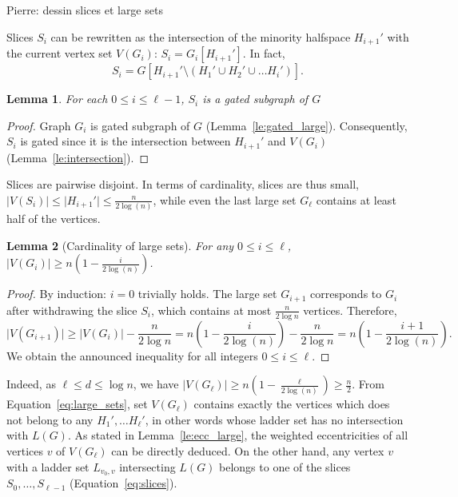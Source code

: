 \documentclass[11pt,letterpaper]{article}
\newtheorem{lemma}{Lemma}
\newcommand{\PB}[1]{{\color{orange} Pierre: #1}}
\begin{document}
\PB{dessin slices et large sets}

Slices $S_i$ can be rewritten as the intersection of the minority halfspace $H_{i+1}'$ with the current vertex set $V(G_i)$: $S_i = G_i[H_{i+1}']$. In fact,
\begin{equation}
S_i = G\left[H_{i+1}' \setminus \left(H_1'\cup H_2'\cup \ldots H_i'\right)\right].
\label{eq:slices}
\end{equation}

\begin{lemma}
For each $0\le i\le \ell-1$, $S_i$ is a gated subgraph of $G$
\label{le:gated_slices}
\end{lemma}
\begin{proof}
Graph $G_i$ is gated subgraph of $G$ (Lemma~\ref{le:gated_large}). Consequently, $S_i$ is gated since it is the intersection between $H_{i+1}'$ and $V(G_i)$ (Lemma~\ref{le:intersection}).
\end{proof}

Slices are pairwise disjoint. In terms of cardinality, slices are thus small, $\vert V(S_i) \vert \le \vert H_{i+1}' \vert \le \frac{n}{2\log(n)}$, while even the last large set $G_{\ell}$ contains at least half of the vertices.

\begin{lemma}[Cardinality of large sets]
For any $0\le i\le \ell$, $\vert V(G_i) \vert \ge n(1-\frac{i}{2\log(n)})$.
\label{le:card_slices}
\end{lemma}
\begin{proof}
By induction: $i=0$ trivially holds. The large set $G_{i+1}$ corresponds to $G_i$ after withdrawing the slice $S_i$, which contains at most $\frac{n}{2\log n}$ vertices. Therefore, $$\vert V(G_{i+1}) \vert \ge \vert V(G_i)\vert - \frac{n}{2\log n} = n\left(1-\frac{i}{2\log(n)}\right) - \frac{n}{2\log n} = n\left(1-\frac{i+1}{2\log(n)}\right).$$
We obtain the announced inequality for all integers $0\le i\le \ell$.
\end{proof}

Indeed, as $\ell \le d\le \log n$, we have $\vert V(G_{\ell})\vert \ge  n(1-\frac{\ell}{2\log(n)}) \ge \frac{n}{2}$. From Equation~\eqref{eq:large_sets}, set $V(G_{\ell})$ contains exactly the vertices which does not belong to any $H_1',\ldots H_{\ell}'$, in other words whose ladder set has no intersection with $L(G)$. As stated in Lemma~\ref{le:ecc_large}, the weighted eccentricities of all vertices $v$ of $V(G_{\ell})$ can be directly deduced. On the other hand, any vertex $v$ with a ladder set $L_{v_0,v}$ intersecting $L(G)$ belongs to one of the slices $S_0,\ldots,S_{\ell-1}$ (Equation~\eqref{eq:slices}).
\end{document}
